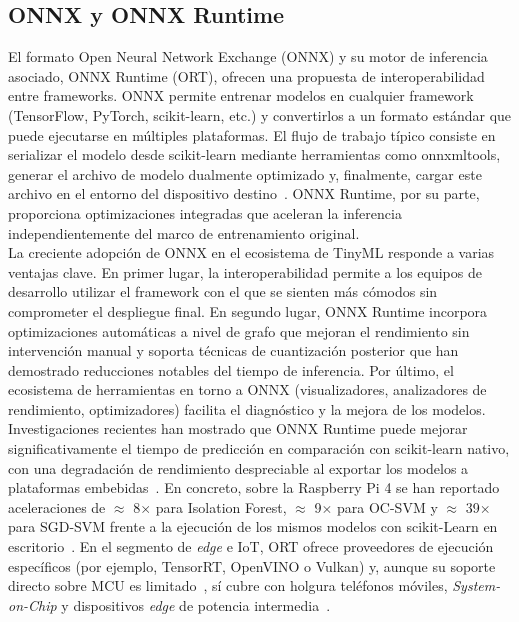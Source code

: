 \documentclass[a4paper,12pt,twoside,final]{book}
\begin{document}
\subsection{ONNX y ONNX Runtime}
El formato Open Neural Network Exchange (ONNX) y su motor de inferencia asociado, ONNX Runtime (ORT), ofrecen una
propuesta de interoperabilidad entre frameworks. ONNX permite entrenar modelos en cualquier framework (TensorFlow,
PyTorch, scikit-learn, etc.) y convertirlos a un formato estándar que puede ejecutarse en múltiples plataformas. El
flujo de trabajo típico consiste en serializar el modelo desde scikit-learn mediante herramientas como onnxmltools,
generar el archivo de modelo dualmente optimizado y, finalmente, cargar este archivo en el entorno del dispositivo
destino~\cite{mani2024npjmicrogravity}. ONNX Runtime, por su parte, proporciona optimizaciones integradas que
aceleran la inferencia independientemente del marco de entrenamiento original.\\

La creciente adopción de ONNX en el ecosistema de TinyML responde a varias ventajas clave. En primer lugar, la
interoperabilidad permite a los equipos de desarrollo utilizar el framework con el que se sienten más cómodos sin
comprometer el despliegue final. En segundo lugar, ONNX Runtime incorpora optimizaciones automáticas a nivel de
grafo que mejoran el rendimiento sin intervención manual y soporta técnicas de cuantización posterior que han
demostrado reducciones notables del tiempo de inferencia. Por último, el ecosistema de herramientas en torno a ONNX
(visualizadores, analizadores de rendimiento, optimizadores) facilita el diagnóstico y la mejora de los modelos.\\

Investigaciones recientes han mostrado que ONNX Runtime puede mejorar significativamente el tiempo de predicción en
comparación con scikit-learn nativo, con una degradación de rendimiento despreciable al exportar los modelos a
plataformas embebidas~\cite{vicente2023fedcsis}. En concreto, sobre la Raspberry Pi 4 se han reportado aceleraciones
de $\approx$ 8$\times$ para Isolation Forest, $\approx$ 9$\times$ para OC-SVM y $\approx$ 39$\times$ para SGD-SVM
frente a la ejecución de los mismos modelos con scikit-Learn en escritorio~\cite{vicente2023fedcsis}. En el segmento
de \textit{edge} e IoT, ORT ofrece proveedores de ejecución específicos (por ejemplo, TensorRT, OpenVINO o Vulkan)
y, aunque su soporte directo sobre MCU es limitado~\cite{somvanshi2025acm}, sí cubre con holgura teléfonos móviles,
\textit{System-on-Chip} y dispositivos \textit{edge} de potencia intermedia~\cite{chinnaraju2025wjarr}.
\end{document}
